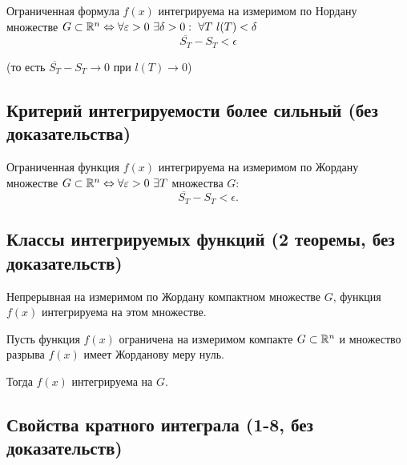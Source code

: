 \begin{theorem}
    Ограниченная формула $ f(x) $ интегрируема на измеримом по Нордану множестве $ G \subset \R^n \iff \forall \epsilon > 0 \ \exists\delta > 0: \ \forall T \ l(T)<\delta$
    \[
        \overline{S_T} - S_T < \epsilon
    \]
    \begin{center}
        (то есть $ \overline{S_T} - S_T \rightarrow 0 $ при $ l(T) \rightarrow 0 $)
    \end{center}
\end{theorem}

\subsection{Критерий интегрируемости более сильный (без доказательства)}

\begin{theorem}
    Ограниченная функция $ f(x) $ интегрируема на измеримом по Жордану множестве $ G \subset \R^n \iff \forall \epsilon > 0 \ \exists T $ множества $ G $:
    \[
        \overline{S_T} - S_T < \epsilon.
    \]
\end{theorem}

\newpage

\subsection{Классы интегрируемых функций (2 теоремы, без доказательств)}

\begin{theorem}
    Непрерывная на измеримом по Жордану компактном множестве $ G $, функция $ f(x) $ интегрируема на этом множестве.
\end{theorem}

\begin{theorem}
    Пусть функция $ f(x) $ ограничена на измеримом компакте $ G \subset \mathbb{R}^n $ и множество разрыва $ f(x) $ имеет Жорданову меру нуль.

    Тогда $ f(x) $ интегрируема на $ G $.
\end{theorem}

\subsection{Свойства кратного интеграла (1-8, без доказательств)}

